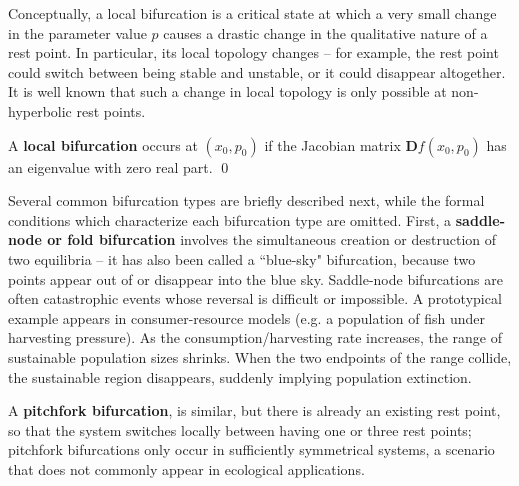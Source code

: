 Conceptually, a local bifurcation is a critical state at which a very small change in the parameter value $p$ causes a drastic change in the qualitative nature of a rest point. In particular, its local topology changes -- for example, the rest point could switch between being stable and unstable, or it could disappear altogether. It is well known that such a change in local topology is only possible at non-hyperbolic rest points. 

\begin{definition}
	A \textbf{local bifurcation} occurs at ${\displaystyle (x_{0}, p_{0})}$ if the Jacobian matrix ${\displaystyle {\mathbf{D}f(x_{0},p _{0})}}$ has an eigenvalue with zero real part. %
	\qed
\end{definition}


Several common bifurcation types are briefly described next, while the formal conditions which characterize each bifurcation type are omitted. First, a 
\textbf{saddle-node or fold bifurcation}
involves the simultaneous creation or destruction of two equilibria -- it has also been called a ``blue-sky" bifurcation, because two points appear out of or disappear into the blue sky. Saddle-node bifurcations are often catastrophic events whose reversal is difficult or impossible. A prototypical example appears in consumer-resource models (e.g. a population of fish under harvesting pressure). As the consumption/harvesting rate increases, the range of sustainable population sizes shrinks. When the two endpoints of the range collide, the sustainable region disappears, suddenly implying population extinction. 

A \textbf{pitchfork bifurcation}, is similar, but there is already an existing rest point, so that the system switches locally between having one or three rest points; pitchfork bifurcations only occur in sufficiently symmetrical systems, a scenario that does not commonly appear in ecological applications. 

